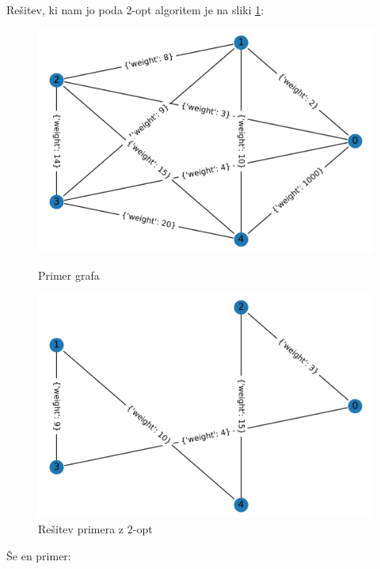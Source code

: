 \documentclass[12pt, a4paper]{article}
\begin{document}
Rešitev, ki nam jo poda 2-opt algoritem je na sliki \ref{resitev_2_opt}:

\begin{figure}[!h]
    
    \begin{minipage}{0.5\textwidth}
    \includegraphics[width=7 cm]{primeri/primer1.png}
    \caption{Primer grafa}
    \label{primeri/primer1.png}
  \end{minipage}
 \hspace{1cm}
  \begin{minipage}{0.5\textwidth}
    \includegraphics[width=7 cm]{primeri/primer1_2opt.png}
    \caption{Rešitev primera z 2-opt}
    \label{resitev_2_opt}
  \end{minipage}
    
\end{figure}

Še en primer:
\end{document}
